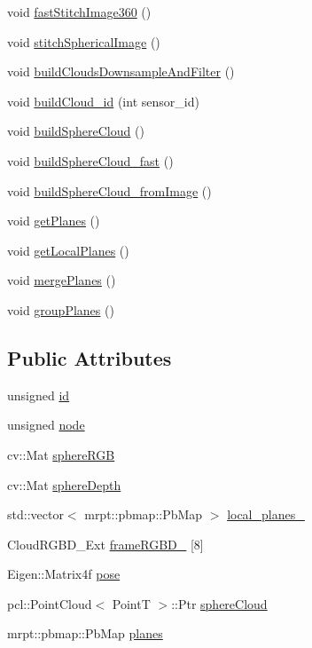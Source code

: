 \begin{DoxyCompactItemize}
\item 
void \hyperlink{classFrame360_a13c217810f0ebf19ee250d27728c31a3}{fast\-Stitch\-Image360} ()
\item 
void \hyperlink{classFrame360_a2c62b8101474b64c5a036b67ddba1aca}{stitch\-Spherical\-Image} ()
\item 
void \hyperlink{classFrame360_a2e14ecd8b3127a73823b2c12276785d2}{build\-Clouds\-Downsample\-And\-Filter} ()
\item 
void \hyperlink{classFrame360_a8d171ce08e7d0bbca74ca8aca63e31e6}{build\-Cloud\-\_\-id} (int sensor\-\_\-id)
\item 
void \hyperlink{classFrame360_a95105c901b6329403f83a3d838817d94}{build\-Sphere\-Cloud} ()
\item 
void \hyperlink{classFrame360_a8b725fbfa17ce40c4c257c22b7b7c1a0}{build\-Sphere\-Cloud\-\_\-fast} ()
\item 
void \hyperlink{classFrame360_a93f41c8ea7355b876e030facb0d18cd0}{build\-Sphere\-Cloud\-\_\-from\-Image} ()
\item 
void \hyperlink{classFrame360_a644ffcfdd92eb632d8444d6c40b37cbd}{get\-Planes} ()
\item 
void \hyperlink{classFrame360_a65fbb46fd6faf22f727cd833b8cc3b61}{get\-Local\-Planes} ()
\item 
void \hyperlink{classFrame360_a8fe1c7a660b67ab59a429a73e1201e0f}{merge\-Planes} ()
\item 
void \hyperlink{classFrame360_ac47448c1e9fdfb124fd08cf0962c98f1}{group\-Planes} ()
\end{DoxyCompactItemize}
\subsection*{Public Attributes}
\begin{DoxyCompactItemize}
\item 
unsigned \hyperlink{classFrame360_a05b50a6279ddaa8b681bfb211bdc35b9}{id}
\item 
unsigned \hyperlink{classFrame360_a18000b5f4598be1308feb31604005aaa}{node}
\item 
cv\-::\-Mat \hyperlink{classFrame360_a38f90dc0b036cf29993025ad0642371f}{sphere\-R\-G\-B}
\item 
cv\-::\-Mat \hyperlink{classFrame360_a6a63c76c3e610f608970f2661fef8adb}{sphere\-Depth}
\item 
std\-::vector$<$ mrpt\-::pbmap\-::\-Pb\-Map $>$ \hyperlink{classFrame360_a697364d4a26a27eecf5206cccd5885bc}{local\-\_\-planes\-\_\-}
\item 
Cloud\-R\-G\-B\-D\-\_\-\-Ext \hyperlink{classFrame360_a25db1945d153eb9c62b4ad432a7098f0}{frame\-R\-G\-B\-D\-\_\-} \mbox{[}8\mbox{]}
\item 
Eigen\-::\-Matrix4f \hyperlink{classFrame360_a0b8606bc778a24d3545ef2ec04a6d88b}{pose}
\item 
pcl\-::\-Point\-Cloud$<$ Point\-T $>$\-::Ptr \hyperlink{classFrame360_a3658614a807a6c6e7e3cbf1a21dd2240}{sphere\-Cloud}
\item 
mrpt\-::pbmap\-::\-Pb\-Map \hyperlink{classFrame360_a254179ae203a42b5e031182edff6c338}{planes}
\end{DoxyCompactItemize}
